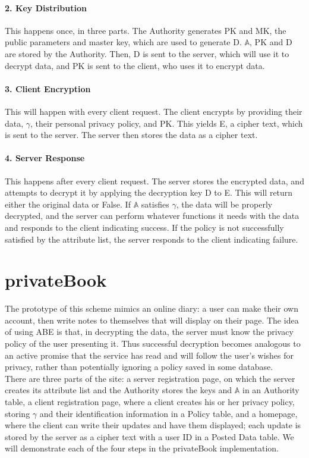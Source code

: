 \documentclass[12pt]{article}
\begin{document}
\paragraph{2. Key Distribution}
This happens once, in three parts. The Authority generates PK and MK, the public parameters and master key, which are used to generate D. $\mathbb{A}$, PK and D are stored by the Authority. Then, D is sent to the server, which will use it to decrypt data, and PK is sent to the client, who uses it to encrypt data.

\paragraph{3. Client Encryption}
This will happen with every client request. The client encrypts by providing their data, $\gamma$, their personal privacy policy, and PK. This yields E, a cipher text, which is sent to the server. The server then stores the data as a cipher text.

\paragraph{4. Server Response}
This happens after every client request. The server stores the encrypted data, and attempts to decrypt it by applying the decryption key D to E. This will return either the original data or False. If $\mathbb{A}$ satisfies $\gamma$, the data will be properly decrypted, and the server can perform whatever functions it needs with the data and responds to the client indicating success. If the policy is not successfully satisfied by the attribute list, the server responds to the client indicating failure.

\section{privateBook}
The prototype of this scheme mimics an online diary: a user can make their own account, then write notes to themselves that will display on their page. The idea of using ABE is that, in decrypting the data, the server must know the privacy policy of the user presenting it. Thus successful decryption becomes analogous to an active promise that the service has read and will follow the user's wishes for privacy, rather than potentially ignoring a policy saved in some database. \\
There are three parts of the site: a server registration page, on which the server creates its attribute list and the Authority stores the keys and $\mathbb{A}$ in an Authority table, a client registration page, where a client creates his or her privacy policy, storing $\gamma$ and their identification information in a Policy table, and a homepage, where the client can write their updates and have them displayed; each update is stored by the server as a cipher text with a user ID in a Posted Data table. We will demonstrate each of the four steps in the privateBook implementation.
\end{document}
